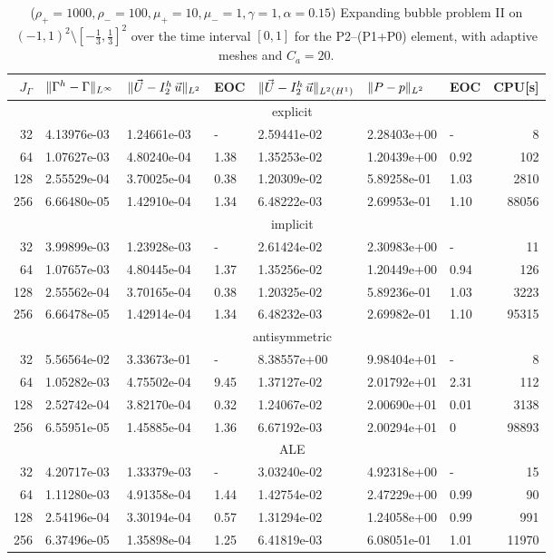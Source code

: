 \begin{table}
\center
\hspace*{-3.25cm}
\begin{tabular}{rllllllr}
\hline
$J_\Gamma$ & $\|\Gamma^h - \Gamma\|_{L^\infty}$ & $\|\vec U - I^h_{2}\,\vec u\|_{L^2}$ & EOC & $\|\vec U - I^h_{2}\,\vec u\|_{L^2(H^1)}$ & $\|P - p\|_{L^2}$ & EOC
& CPU[s] \\
\hline
& \multicolumn{7}{c}{explicit} \\
\hline
 32 & 4.13976e-03 & 1.24661e-03 &    - & 2.59441e-02 & 2.28403e+00 &    - &
8 \\
 64 & 1.07627e-03 & 4.80240e-04 & 1.38 & 1.35253e-02 & 1.20439e+00 & 0.92 &
102 \\
128 & 2.55529e-04 & 3.70025e-04 & 0.38 & 1.20309e-02 & 5.89258e-01 & 1.03 &
2810 \\
256 & 6.66480e-05 & 1.42910e-04 & 1.34 & 6.48222e-03 & 2.69953e-01 & 1.10 &
88056 \\
\hline
& \multicolumn{7}{c}{implicit} \\
\hline
 32 & 3.99899e-03 & 1.23928e-03 &    - & 2.61424e-02 & 2.30983e+00 &    - &
11 \\
 64 & 1.07657e-03 & 4.80445e-04 & 1.37 & 1.35256e-02 & 1.20449e+00 & 0.94 &
126 \\
128 & 2.55562e-04 & 3.70165e-04 & 0.38 & 1.20325e-02 & 5.89236e-01 & 1.03 &
3223 \\
256 & 6.66478e-05 & 1.42914e-04 & 1.34 & 6.48232e-03 & 2.69982e-01 & 1.10 &
95315 \\
\hline
& \multicolumn{7}{c}{antisymmetric} \\
\hline
 32 & 5.56564e-02 & 3.33673e-01 &    - & 8.38557e+00 & 9.98404e+01 &    - &
8 \\
 64 & 1.05282e-03 & 4.75502e-04 & 9.45 & 1.37127e-02 & 2.01792e+01 & 2.31 &
112 \\
128 & 2.52742e-04 & 3.82170e-04 & 0.32 & 1.24067e-02 & 2.00690e+01 & 0.01 &
3138 \\
256 & 6.55951e-05 & 1.45885e-04 & 1.36 & 6.67192e-03 & 2.00294e+01 &    0 &
98893 \\
\hline
& \multicolumn{7}{c}{ALE} \\
\hline
 32 & 4.20717e-03 & 1.33379e-03 &    - & 3.03240e-02 & 4.92318e+00 &    - &
15 \\
 64 & 1.11280e-03 & 4.91358e-04 & 1.44 & 1.42754e-02 & 2.47229e+00 & 0.99 &
90 \\
128 & 2.54196e-04 & 3.30194e-04 & 0.57 & 1.31294e-02 & 1.24058e+00 & 0.99 &
991 \\
256 & 6.37496e-05 & 1.35898e-04 & 1.25 & 6.41819e-03 & 6.08051e-01 & 1.01 &
11970 \\
\hline
\end{tabular}
\hspace*{-3.25cm}
\caption[Navier--Stokes expanding bubble II errors P2--(P1+P0)]
{($\rho_+ = 1000,\rho_- = 100,\mu_+ = 10,\mu_- =1,\gamma = 1,\alpha=0.15$)
Expanding bubble problem II on $(-1,1)^2\setminus[-\frac{1}{3},\frac{1}{3}]^2$
over the time interval $[0,1]$ for the P2--(P1+P0) element, with adaptive
meshes and $C_a=20$\textdegree.}
\label{tab:nsexpandingbubbleIIp2p1p0}
\end{table}
